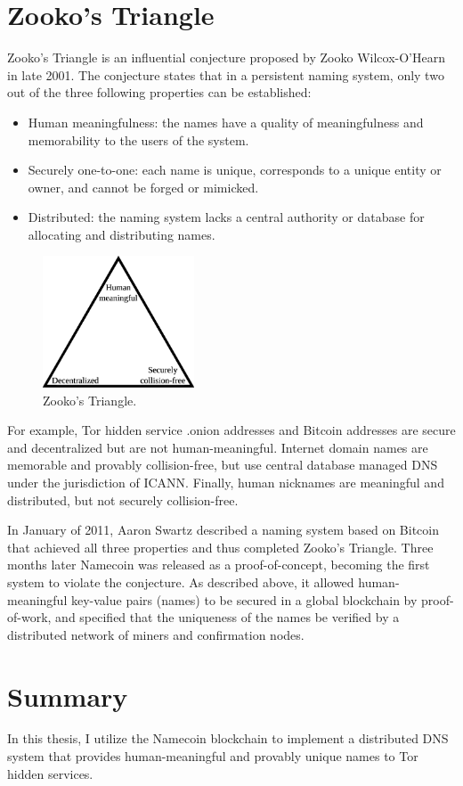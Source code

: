 \section{Zooko's Triangle}

Zooko's Triangle is an influential conjecture proposed by Zooko Wilcox-O'Hearn in late 2001. The conjecture states that in a persistent naming system, only two out of the three following properties can be established:\cite{Ferdous2009}

\begin{itemize}
  \item Human meaningfulness: the names have a quality of meaningfulness and memorability to the users of the system. 
  \item Securely one-to-one: each name is unique, corresponds to a unique entity or owner, and cannot be forged or mimicked.
  \item Distributed: the naming system lacks a central authority or database for allocating and distributing names.
\end{itemize}

\begin{figure}[htbp]
	\centering
	\includegraphics[width=0.4\textwidth]{images/Zooko.eps}
	\caption{Zooko's Triangle.}
	\label{fig:figure8}
\end{figure}

For example, Tor hidden service .onion addresses and Bitcoin addresses are secure and decentralized but are not human-meaningful. Internet domain names are memorable and provably collision-free, but use central database managed DNS under the jurisdiction of ICANN. Finally, human nicknames are meaningful and distributed, but not securely collision-free.\cite{Stiegler2005}

In January of 2011, Aaron Swartz described a naming system based on Bitcoin that achieved all three properties and thus completed Zooko's Triangle. Three months later Namecoin was released as a proof-of-concept, becoming the first system to violate the conjecture. As described above, it allowed human-meaningful key-value pairs (names) to be secured in a global blockchain by proof-of-work, and specified that the uniqueness of the names be verified by a distributed network of miners and confirmation nodes.





\section{Summary}

In this thesis, I utilize the Namecoin blockchain to implement a distributed DNS system that provides human-meaningful and provably unique names to Tor hidden services.

